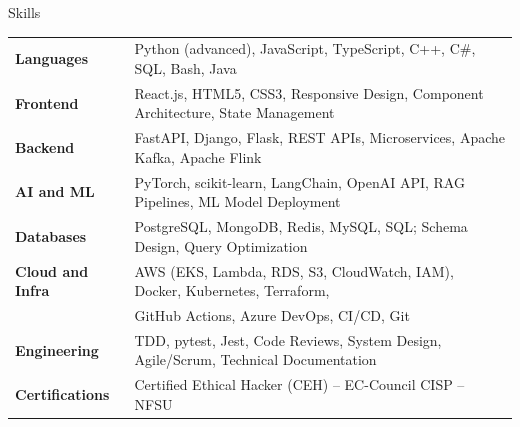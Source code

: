 \documentclass{resume}
\begin{document}
\vspace{-2mm}

\begin{rSection}{Skills}

\begin{tabular}{ @{} >{\bfseries}l @{\hspace{4ex}} l }
Languages       & Python (advanced), JavaScript, TypeScript, C++, C\#, SQL, Bash, Java \\
Frontend        & React.js, HTML5, CSS3, Responsive Design, Component Architecture, State Management \\
Backend         & FastAPI, Django, Flask, REST APIs, Microservices, Apache Kafka, Apache Flink \\
AI and ML       & PyTorch, scikit-learn, LangChain, OpenAI API, RAG Pipelines, ML Model Deployment \\
Databases       & PostgreSQL, MongoDB, Redis, MySQL, SQL; Schema Design, Query Optimization \\
Cloud and Infra & AWS (EKS, Lambda, RDS, S3, CloudWatch, IAM), Docker, Kubernetes, Terraform, \\
                & GitHub Actions, Azure DevOps, CI/CD, Git \\
Engineering     & TDD, pytest, Jest, Code Reviews, System Design, Agile/Scrum, Technical Documentation \\
Certifications  & Certified Ethical Hacker (CEH) -- EC-Council \textbar{} CISP -- NFSU \\
\end{tabular}

\end{rSection}
\end{document}
